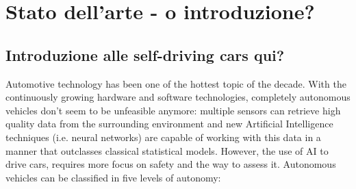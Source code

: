 \chapter{Stato dell'arte - o introduzione?}

\section{Introduzione alle self-driving cars qui?}

Automotive technology has been one of the hottest topic of the decade.\newline 
With the continuously growing hardware and software technologies, completely autonomous vehicles don't seem to be unfeasible anymore: multiple sensors can retrieve high quality data from the surrounding environment and new Artificial Intelligence techniques (i.e. neural networks) are capable of working with this data in a manner that outclasses classical statistical models. However, the use of AI to drive cars, requires more focus on safety and the way to assess it.\newline
Autonomous vehicles can be classified in five levels of autonomy:

